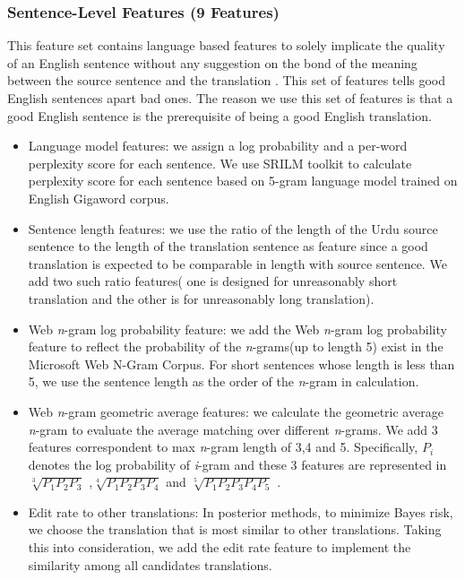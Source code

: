 \documentclass[11pt]{article}
\begin{document}
\subsubsection{Sentence-Level Features (9 Features)}
This feature set contains language based features to solely implicate the quality of an English sentence without any suggestion on the bond of the meaning between the source sentence and the translation . This set of features tells good English sentences apart bad ones. The reason we use this set of features is that a good English sentence is the prerequisite of being a good English translation.
\begin{itemize}
\item Language model features:	we assign a log probability and a per-word perplexity score for each sentence. We use SRILM toolkit to calculate perplexity score for each sentence based on 5-gram language model trained on English Gigaword corpus.
\item Sentence length features:	we use the ratio of the length of the Urdu source sentence to the length of  the translation sentence as feature since a good translation is expected to be comparable in length with source sentence. We add two such ratio features( one is designed for unreasonably short translation and the other is for unreasonably long translation).
\item Web \textit{n}-gram log probability feature: we add the Web \textit{n}-gram log probability feature to reflect  the probability of the \textit{n}-grams(up to length 5) exist in the Microsoft Web N-Gram Corpus. For short sentences whose length is less than 5, we use the sentence length as the order of the \textit{n}-gram in calculation.
\item Web \textit{n}-gram geometric average features: we calculate the geometric average \textit{n}-gram  to evaluate the average matching over different \textit{n}-grams. We add 3 features correspondent to max \textit{n}-gram length of 3,4 and 5. Specifically, $P_i$ denotes the log probability of \textit{i}-gram and these 3 features are represented in $\sqrt[3]{P_1 P_2 P_3}$ ,$\sqrt[4]{P_1 P_2 P_3 P_4}$ and $\sqrt[5]{P_1 P_2 P_3 P_4 P_5}$ .
\item Edit rate to other translations: In posterior methods, to minimize Bayes risk, we choose the translation  that is most similar to other translations. Taking this into consideration, we add the edit rate feature to implement the similarity among all candidates translations.
\end{itemize}
\end{document}
